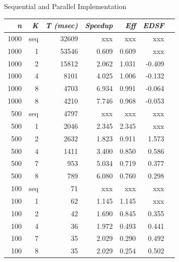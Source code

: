 \documentclass{dependencies/acm_proc_article-sp}
\begin{document}
Sequential and Parallel Implementation
\begin{center}
\begin{tabular}{|r|r|r|r|r|r|r|}\hline
{\em n} & {\em K} & {\em T (msec)} & {\em Speedup} & {\em Eff} & {\em EDSF} \\\hline
1000    & seq     &   32609        &   xxx         & xxx       & xxx        \\\hline
1000    & 1       &   53546        & 0.609        & 0.609    & xxx        \\\hline
1000    & 2       &   15812        & 2.062        & 1.031    & -0.409     \\\hline
1000    & 4       &    8101        & 4.025        & 1.006    & -0.132     \\\hline
1000    & 8       &    4703        & 6.934        & 0.991    & -0.064     \\\hline
1000    & 8       &    4210        & 7.746        & 0.968    & -0.053     \\\hline
500     & seq     &    4797        &   xxx         & xxx       & xxx        \\\hline
500     & 1       &    2046        & 2.345         & 2.345     & xxx        \\\hline
500     & 2       &    2632        & 1.823         & 0.911      & 1.573      \\\hline
500     & 4       &    1411        & 3.400         & 0.850     & 0.586      \\\hline
500     & 7       &     953        & 5.034         & 0.719     & 0.377      \\\hline
500     & 8       &     789        & 6.080         & 0.760     & 0.298      \\\hline
100     & seq     &      71        &   xxx         & xxx       & xxx        \\\hline
100     & 1       &      62        & 1.145        & 1.145    & xxx        \\\hline
100     & 2       &      42        & 1.690        & 0.845    & 0.355     \\\hline
100     & 4       &      36        & 1.972        & 0.493    & 0.441     \\\hline
100     & 7       &      35        & 2.029        & 0.290    & 0.492     \\\hline
100     & 8       &      35        & 2.029        & 0.254    & 0.502     \\\hline
\end{tabular}
\end{center}
\end{document}
